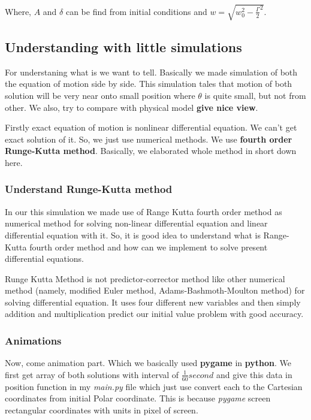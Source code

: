 \documentclass[11pt,a4paper]{article}
\begin{document}
Where, \(A\) and \(\delta\) can be find from initial conditions and \(w = \sqrt{w_{0}^{2}-\frac{\Gamma}{2}^{2}}\).



\subsection{Understanding with little simulations}
\label{sec:org4c19526}

For understaning what is we want to tell. Basically we made simulation of both the equation of motion side by side. This simulation tales that motion of both solution will be very near onto small position where \(\theta\) is quite small, but not from other. We also, try to compare with physical model \textbf{give nice view}.

Firstly exact equation of motion is nonlinear differential equation. We can't get exact solution of it. So, we just use numerical methods. We use \textbf{fourth order Runge-Kutta method}. Basically, we elaborated whole method in short down here. 

\subsubsection{Understand Runge-Kutta method}
\label{sec:orgc0cb7f2}

In our this simulation we made use of Range Kutta fourth order method as numerical method for solving non-linear differential equation and linear differential equation with it. So, it is good idea to understand what is Range-Kutta fourth order method and how can we implement to solve present differential equations.

Runge Kutta Method is not predictor-corrector method like other numerical method (namely, modified Euler method, Adams-Bashmoth-Moulton method) for solving differential equation. It uses four different new variables and then simply addition and multiplication predict our initial value problem with good accuracy.






\subsubsection{Animations}
\label{sec:org3c26531}

Now, come animation part. Which we basically used \textbf{pygame} in \textbf{python}. We first get array of both solutions with interval of \(\frac{1}{60} second\) and give this data in position function in my \emph{main.py} file which just use convert each to the Cartesian coordinates from initial Polar coordinate. This is because \emph{pygame} screen rectangular coordinates with units in pixel of screen.
\end{document}
